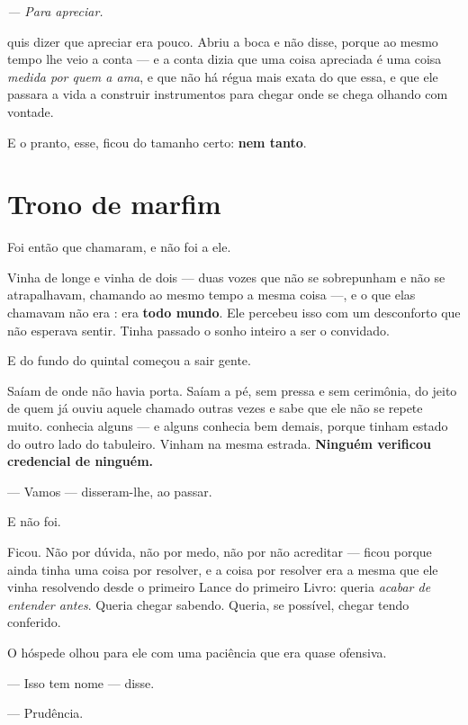 \documentclass[livro.tex]{subfiles}
\begin{document}
\begin{center}
\emph{--- Para apreciar.}
\end{center}

\noindent \Ben quis dizer que apreciar era pouco. Abriu a boca e não disse,
porque ao mesmo tempo lhe veio a conta --- e a conta dizia que uma coisa
apreciada é uma coisa \emph{medida por quem a ama}, e que não há régua mais
exata do que essa, e que ele passara a vida a construir instrumentos para
chegar onde se chega olhando com vontade.

\medskip
\noindent E o pranto, esse, ficou do tamanho certo: \textbf{nem tanto}.

\chapter{Trono de marfim}

Foi então que chamaram, e não foi a ele.

Vinha de longe e vinha de dois --- duas vozes que não se sobrepunham e não se
atrapalhavam, chamando ao mesmo tempo a mesma coisa ---, e o que elas chamavam
não era \emph{\Ben }: era \textbf{todo mundo}. Ele percebeu isso com um
desconforto que não esperava sentir. Tinha passado o sonho inteiro a ser o
convidado.

\medskip
\noindent E do fundo do quintal começou a sair gente.

Saíam de onde não havia porta. Saíam a pé, sem pressa e sem cerimônia, do jeito
de quem já ouviu aquele chamado outras vezes e sabe que ele não se repete
muito. \Ben conhecia alguns --- e alguns conhecia bem demais, porque tinham
estado do outro lado do tabuleiro. Vinham na mesma estrada. \textbf{Ninguém
verificou credencial de ninguém.}

\medskip
\noindent --- Vamos --- disseram-lhe, ao passar.

E \Ben não foi.

\medskip
\noindent Ficou. Não por dúvida, não por medo, não por não acreditar --- ficou
porque ainda tinha uma coisa por resolver, e a coisa por resolver era a mesma
que ele vinha resolvendo desde o primeiro Lance do primeiro Livro: queria
\emph{acabar de entender antes}. Queria chegar sabendo. Queria, se possível,
chegar tendo conferido.

\medskip
\noindent O hóspede olhou para ele com uma paciência que era quase ofensiva.

--- Isso tem nome --- disse.

--- Prudência.
\end{document}
